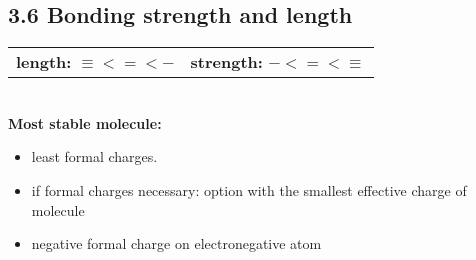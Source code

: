 \subsection{3.6 Bonding strength and length}
    \begin{tabular}{c c}
        \textbf{length:} $\equiv < = < -$ & \textbf{strength:} $- < = < \equiv$\\
    \end{tabular}
    \vspace*{0.5em}\\
    \textbf{Most stable molecule:}
    \begin{itemize}
        \itemsep0em
        \item least formal charges.
        \item if formal charges necessary: option with the smallest effective charge of molecule
        \item negative formal charge on electronegative atom
    \end{itemize}
